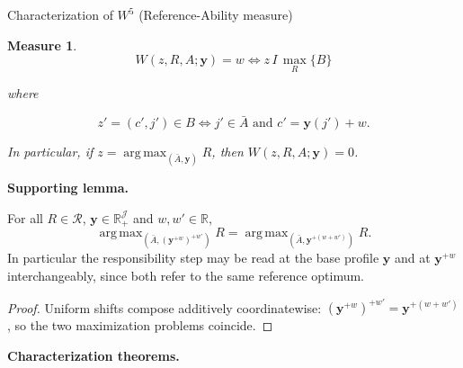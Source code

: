 \documentclass[10pt]{beamer}
\DeclareMathOperator*{\argmax}{arg\,max}
\newtheorem{Measure}{Measure}
\begin{document}
\begin{frame}[allowframebreaks]{Characterization of $W^5$ (Reference-Ability measure)}
\hypertarget{char:w5}{}%
\hyperlink{tab:classification}{}
\begin{Measure}
    \begin{equation*}
W(z,R,A;\mathbf{y})=w
\Leftrightarrow
z\,I\,\max_R\{B\}
\end{equation*}

where

\begin{equation*}
z'=(c',j')\in B
\Leftrightarrow
j'\in \bar{A}
\textrm{ and }
c'=\mathbf{y}(j')+w.
\end{equation*}

In particular, if $z=\argmax_{(\bar{A},\mathbf{y})}R$, then $W(z,R,A;\mathbf{y})=0$.
\end{Measure}
\scriptsize
\textbf{Supporting lemma.}

\begin{lemma}
For all $R\in\mathcal R$, $\mathbf y\in\mathbb R_+^{\mathcal J}$ and
$w,w'\in\mathbb R$,
\begin{equation*}
\argmax_{(\bar A,(\mathbf y^{+w})^{+w'})}R=\argmax_{(\bar A,\mathbf y^{+(w+w')})}R.
\end{equation*}
In particular the responsibility step may be read at the base
profile $\mathbf y$ and at $\mathbf y^{+w}$ interchangeably, since both refer to
the same reference optimum.
\end{lemma}

\begin{proof}
Uniform shifts compose additively coordinatewise:
$(\mathbf y^{+w})^{+w'}=\mathbf y^{+(w+w')}$, so the two maximization problems
coincide.
\end{proof}

\medskip\textbf{Characterization theorems.}


\end{frame}
\end{document}
